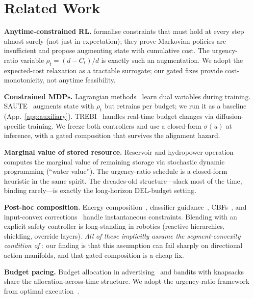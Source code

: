 \documentclass{article}
\begin{document}
\section{Related Work}
\label{sec:related}

\textbf{Anytime-constrained RL.}
\citet{mcmahan2024anytime} formalise constraints that must hold at every step almost surely (not just in expectation); they prove Markovian policies are insufficient and propose augmenting state with cumulative cost.
The urgency-ratio variable $\rho_t = (d-C_t)/d$ is exactly such an augmentation.
We adopt the expected-cost relaxation as a tractable surrogate; our gated fixes provide cost-monotonicity, not anytime feasibility.

\textbf{Constrained MDPs.}
Lagrangian methods~\citep{altman1999constrained, achiam2017cpo, stooke2020responsive, chen2025predictive} learn dual variables during training.
SAUTE~\citep{sootla2022saute} augments state with $\rho_t$ but retrains per budget; we run it as a baseline (App.~\ref{app:auxiliary}).
TREBI~\citep{lin2023trebi} handles real-time budget changes via diffusion-specific training.
We freeze both controllers and use a closed-form $\sigma(u)$ at inference, with a gated composition that survives the alignment hazard.

\textbf{Marginal value of stored resource.}
Reservoir and hydropower operation~\citep{tilmant2008water, you2008hedging} computes the marginal value of remaining storage via stochastic dynamic programming (``water value'').
The urgency-ratio schedule is a closed-form heuristic in the same spirit.
The decades-old structure---slack most of the time, binding rarely---is exactly the long-horizon DEL-budget setting.

\textbf{Post-hoc composition.}
Energy composition~\citep{urain2023composable}, classifier guidance~\citep{zhang2025constrained}, CBFs~\citep{xiao2023safediffuser}, and input-convex corrections~\citep{durkin2025picnn} handle instantaneous constraints.
Blending with an explicit safety controller is long-standing in robotics (reactive hierarchies, shielding, override layers).
\emph{All of these implicitly assume the segment-convexity condition of }; our finding is that this assumption can fail sharply on directional action manifolds, and that gated composition is a cheap fix.

\textbf{Budget pacing.}
Budget allocation in advertising~\citep{balseiro2023budget} and bandits with knapsacks~\citep{agrawal2014bandits} share the allocation-across-time structure.
We adopt the urgency-ratio framework from optimal execution~\citep{almgren2001optimal}.
\end{document}
